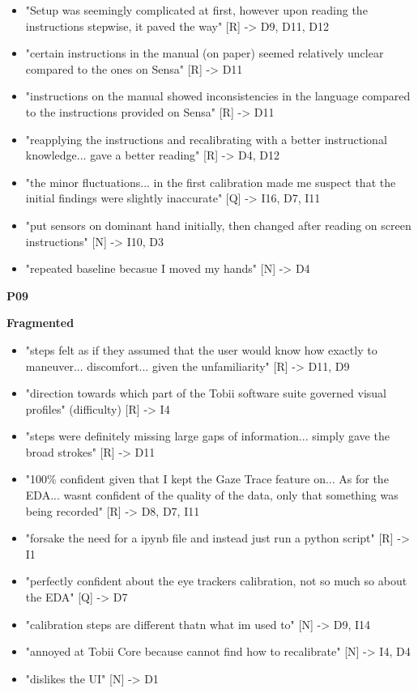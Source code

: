 \documentclass[
]{article}
\begin{document}
\begin{itemize}
\item
  "Setup was seemingly complicated at first, however upon reading the instructions stepwise, it paved the way" {[}R{]} -\textgreater{} D9, D11, D12
\item
  "certain instructions in the manual (on paper) seemed relatively unclear compared to the ones on Sensa" {[}R{]} -\textgreater{} D11
\item
  "instructions on the manual showed inconsistencies in the language compared to the instructions provided on Sensa" {[}R{]} -\textgreater{} D11
\item
  "reapplying the instructions and recalibrating with a better instructional knowledge... gave a better reading" {[}R{]} -\textgreater{} D4, D12
\item
  "the minor fluctuations... in the first calibration made me suspect that the initial findings were slightly inaccurate" {[}Q{]} -\textgreater{} I16, D7, I11
\item
  "put sensors on dominant hand initially, then changed after reading on screen instructions" {[}N{]} -\textgreater{} I10, D3
\item
  "repeated baseline becasue I moved my hands" {[}N{]} -\textgreater{} D4
\end{itemize}

\textbf{P09}

\textbf{Fragmented}

\begin{itemize}
\item
  "steps felt as if they assumed that the user would know how exactly to maneuver... discomfort... given the unfamiliarity" {[}R{]} -\textgreater{} D11, D9
\item
  "direction towards which part of the Tobii software suite governed visual profiles" (difficulty) {[}R{]} -\textgreater{} I4
\item
  "steps were definitely missing large gaps of information... simply gave the broad strokes" {[}R{]} -\textgreater{} D11
\item
  "100\% confident given that I kept the Gaze Trace feature on... As for the EDA... wasn\textquotesingle t confident of the quality of the data, only that something was being recorded" {[}R{]} -\textgreater{} D8, D7, I11
\item
  "forsake the need for a ipynb file and instead just run a python script" {[}R{]} -\textgreater{} I1
\item
  "perfectly confident about the eye tracker\textquotesingle s calibration, not so much so about the EDA" {[}Q{]} -\textgreater{} D7
\item
  "calibration steps are different thatn what im used to" {[}N{]} -\textgreater{} D9, I14
\item
  "annoyed at Tobii Core because cannot find how to recalibrate" {[}N{]} -\textgreater{} I4, D4
\item
  "dislikes the UI" {[}N{]} -\textgreater{} D1
\end{itemize}
\end{document}

